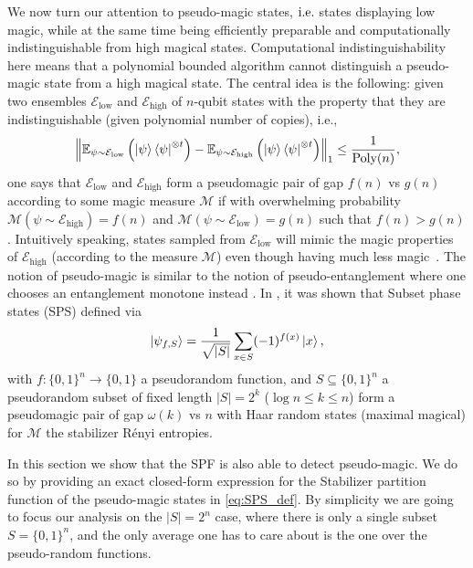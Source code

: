 \documentclass[aps,pra,superscriptaddress,twocolumn,longbibliography]{revtex4-2}
\newcounter{algorithm}
\begin{document}
We now turn our attention to pseudo-magic states, ${\rm i.e.}$ states displaying low magic, while at the same time being efficiently preparable and computationally indistinguishable from high magical states. 
Computational indistinguishability here means that a polynomial bounded algorithm cannot distinguish a pseudo-magic state from a high magical state.
The central idea is the following: given two ensembles $\mathcal{E}_{\text{low}}$ and $\mathcal{E}_{\text{high}}$ of $n$-qubit states with the property that they are indistinguishable (given polynomial number of copies), i.e.,
\begin{align*}
    \left \| \mathbb{E}_{\psi\sim\mathcal{E}_{\text{low}}}\left(\ket{\psi}\bra{\psi}^{\otimes t}\right)- \mathbb{E}_{\psi \sim \mathcal{E}_{\text{high}}}\left(\ket{\psi}\bra{\psi}^{\otimes t}\right)  \right \|_{1} \leq  \frac{1}{\text{Poly}(n)},
\end{align*}
one says that $\mathcal{E}_{\text{low}}$ and $\mathcal{E}_{\text{high}}$ form a pseudomagic pair of gap $f(n)$ vs $g(n)$ according to some magic measure $\mathcal{M}$ if with overwhelming probability $\mathcal{M}(\psi \sim \mathcal{E}_{\text{high}}) = f(n)$ and $\mathcal{M}(\psi \sim \mathcal{E}_{\text{low}}) = g(n)$ such that $f(n) > g(n)$. Intuitively speaking, states sampled from $\mathcal{E}_{\text{low}}$ will mimic the magic properties of $\mathcal{E}_{\text{high}}$ (according to the measure $\mathcal{M}$) even though having much less magic~\cite{Gu/pseudomagic/2024}. 
The notion of pseudo-magic is similar to the notion of pseudo-entanglement where one chooses an entanglement monotone instead \cite{Aaronson/pseudoentanglement/2022}. 
In \cite{Aaronson/pseudoentanglement/2022,Gu/pseudomagic/2024}, it was shown that Subset phase states (SPS) defined via 
%
\begin{equation}
\label{eq:SPS_def}
    \ket{\psi_{f,S}}=\frac{1}{\sqrt{|S|}}\sum_{x \in S}(-1)^{f(x)}\ket{x},
\end{equation}
%
with $f:\{0,1\}^{n}\to \{0,1\}$ a pseudorandom function, and $S \subseteq \{0,1\}^{n}$ a pseudorandom subset of fixed length  $|S|=2^{k}$ ($\log{n}\leq k\leq n$) form a pseudomagic pair of gap $\omega(k)$ vs $n$ with Haar random states (maximal magical) for $\mathcal{M}$ the stabilizer R\'enyi entropies.

In this section we show that the SPF is also able to detect pseudo-magic. 
We do so by providing an exact closed-form expression for the Stabilizer partition function of the pseudo-magic states in \eqref{eq:SPS_def}. By simplicity we are going to focus our analysis on the $|S|=2^{n}$ case, where there is only a single subset $S=\{0,1\}^{n}$, and the only average one has to care about is the one over the pseudo-random functions.
\end{document}
